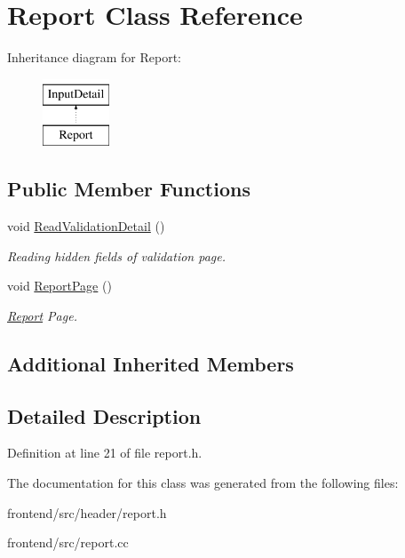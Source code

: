 \hypertarget{classReport}{\section{Report Class Reference}
\label{classReport}
}
Inheritance diagram for Report\-:\begin{figure}[H]
\begin{center}
\leavevmode
\includegraphics[height=2.000000cm]{classReport}
\end{center}
\end{figure}
\subsection*{Public Member Functions}
\begin{DoxyCompactItemize}
\item 
\hypertarget{classReport_a4956ae80ad7ed501162a3a7345ccd2e8}{void \hyperlink{classReport_a4956ae80ad7ed501162a3a7345ccd2e8}{Read\-Validation\-Detail} ()}\label{classReport_a4956ae80ad7ed501162a3a7345ccd2e8}

\begin{DoxyCompactList}\small\item\em Reading hidden fields of validation page. \end{DoxyCompactList}\item 
\hypertarget{classReport_aa763587ca224dc7a1011c8e235937f24}{void \hyperlink{classReport_aa763587ca224dc7a1011c8e235937f24}{Report\-Page} ()}\label{classReport_aa763587ca224dc7a1011c8e235937f24}

\begin{DoxyCompactList}\small\item\em \hyperlink{classReport}{Report} Page. \end{DoxyCompactList}\end{DoxyCompactItemize}
\subsection*{Additional Inherited Members}


\subsection{Detailed Description}


Definition at line 21 of file report.\-h.



The documentation for this class was generated from the following files\-:\begin{DoxyCompactItemize}
\item 
frontend/src/header/report.\-h\item 
frontend/src/report.\-cc\end{DoxyCompactItemize}
